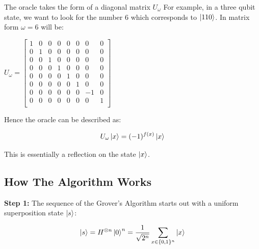 \documentclass{article}
\begin{document}
\noindent
The oracle takes the form of a diagonal matrix $U_{\omega}$
\vspace{5mm}
\noindent
For example, in a three qubit state, we want to look for the number 6 which corresponds to $\ket{110}$. In matrix form $\omega =6$ will be:
\vspace{5mm}

\qquad $ U_\omega = \begin{bmatrix}

1 & 0 & 0 & 0 & 0& 0 & 0& 0 \\
0 & 1 & 0 & 0 & 0& 0 & 0& 0 \\
0 & 0 & 1 & 0 & 0& 0 & 0& 0 \\
0 & 0 & 0 & 1 & 0& 0 & 0& 0 \\
0 & 0 & 0 & 0 & 1& 0 & 0& 0 \\
0 & 0 & 0 & 0 & 0& 1 & 0& 0 \\
0 & 0 & 0 & 0 & 0& 0 & -1& 0 \\
0 & 0 & 0 & 0 & 0& 0 & 0& 1 \\

\end{bmatrix}$
\vspace{5mm}

Hence the oracle can be described as:
\vspace{5mm}

\begin{equation}
U_\omega\ket{x} = (-1)^{f(x)} \ket{x}    
\end{equation}
\vspace{5mm}

This is essentially a reflection on the state $\ket{x}$.

\pagebreak

\subsection{How The Algorithm Works} \label{How the Algorithm Works}
\vspace{5mm}

\textbf{Step 1:}
\vspace{5mm}
\noindent
The sequence of the Grover's Algorithm starts out with a uniform superposition state $\ket{s}$\cite{noauthor_grovers_nodate}:
\vspace{5mm}

\begin{equation}
\ket{s}= H^{\otimes n} \ket{0}^n = \frac{1}{\sqrt{2^n}}\sum\limits_{x \in \{0,1\}^n}\ket{x}
\end{equation}
\vspace{5mm}
\end{document}
